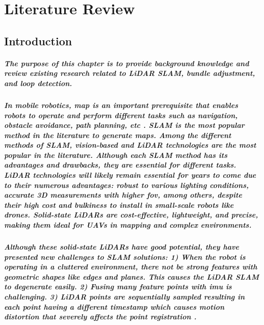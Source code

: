 \chapter{Literature Review}
\label{ch:review}

\section{Introduction}
\paragraph{\textnormal{The purpose of this chapter is to provide background knowledge and review existing research related to LiDAR SLAM, bundle adjustment, and loop detection.}}

\paragraph{\textnormal{In mobile robotics, map is an important prerequisite that enables robots to operate and perform different tasks such as navigation, obstacle avoidance, path planning, etc \cite{kelly2013mobile}. SLAM is the most popular method in the literature to generate maps\cite{cadena2016past}. Among the different methods of SLAM, vision-based and LiDAR technologies are the most popular in the literature\cite{garigipati2022evaluation}. Although each SLAM method has its advantages and drawbacks, they are essential for different tasks. LiDAR technologies will likely remain essential for years to come due to their numerous advantages\cite{zhang2017low}: robust to various lighting conditions, accurate 3D measurements with higher \gls{fov}, among others, despite their high cost and bulkiness to install in small-scale robots like drones. Solid-state LiDARs are cost-effective, lightweight, and precise, making them ideal for UAVs in mapping and complex environments\cite{rinftech_lidar_guide}. }}

\paragraph{\textnormal{Although these solid-state LiDARs have good potential, they have presented new challenges to SLAM solutions: 1) When the robot is operating in a cluttered environment, there not be strong features with geometric shapes like edges and planes. This causes the LiDAR SLAM to degenerate easily. 2) Fusing many feature points with \gls{imu} is challenging. 3) LiDAR points are sequentially sampled resulting in each point having a different timestamp which causes motion distortion that severely affects the point registration \cite{xu2021fastlio}.}}

